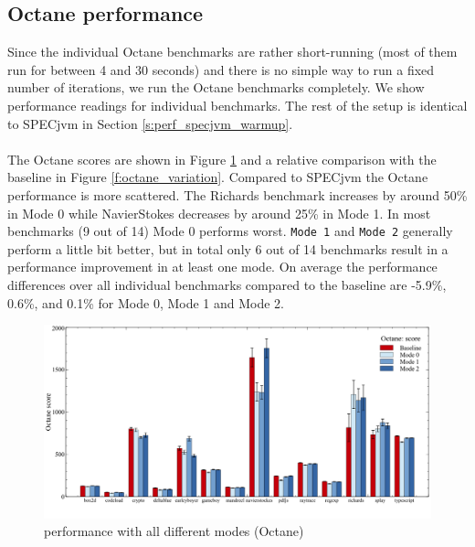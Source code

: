 \subsection{Octane performance}
\label{s:perf_octane}
Since the individual Octane benchmarks are rather short-running (most of them run for between 4 and 30 seconds) and there is no simple way to run a fixed number of iterations, we run the Octane benchmarks completely. We show performance readings for individual benchmarks. The rest of the setup is identical to SPECjvm in Section \ref{s:perf_specjvm_warmup}.
\\\\
The Octane scores are shown in Figure \ref{f:octane} and a relative comparison with the baseline in Figure \ref{f:octane_variation}.
Compared to SPECjvm the Octane performance is more scattered. The Richards benchmark increases by around 50\% in Mode 0 while NavierStokes decreases by around 25\% in Mode 1. In most benchmarks (9 out of 14) Mode 0 performs worst.
\texttt{Mode 1} and \texttt{Mode 2} generally perform a little bit better, but in total only 6 out of 14 benchmarks result in a performance improvement in at least one mode.
On average the performance differences over all individual benchmarks compared to the baseline are -5.9\%, 0.6\%, and 0.1\% for Mode 0, Mode 1 and Mode 2.
\begin{figure}[ht]
  \begin{center}
    \centering
    \includegraphics[width=1.0\textwidth]{figures/octane.png}
    \caption{performance with all different modes (Octane)}
    \label{f:octane}
  \end{center}
\end{figure}

